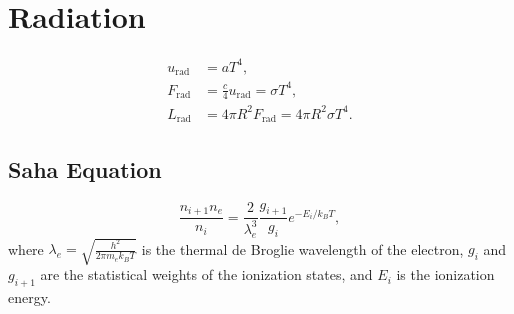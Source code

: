 \section{Radiation}
\begin{theory}
\begin{align}
u_{\text{rad}} &= aT^4, \\  
F_{\text{rad}} &= \frac{c}{4}u_{\text{rad}} = \sigma T^4, \\
L_{\text{rad}} &= 4\pi R^2 F_{\text{rad}} = 4\pi R^2 \sigma T^4.
\end{align} 
\end{theory}

\subsection{Saha Equation}

\begin{theory}
\begin{equation}
\frac{n_{i+1} n_e}{n_i} = \frac{2}{\lambda_e^3} \frac{g_{i+1}}{g_i} e^{-E_i/k_B T},
\end{equation}
where $\lambda_e = \sqrt{\frac{h^2}{2\pi m_e k_B T}}$ is the thermal de Broglie wavelength of the electron, $g_i$ and $g_{i+1}$ are the statistical weights of the ionization states, and $E_i$ is the ionization energy.
\end{theory}

